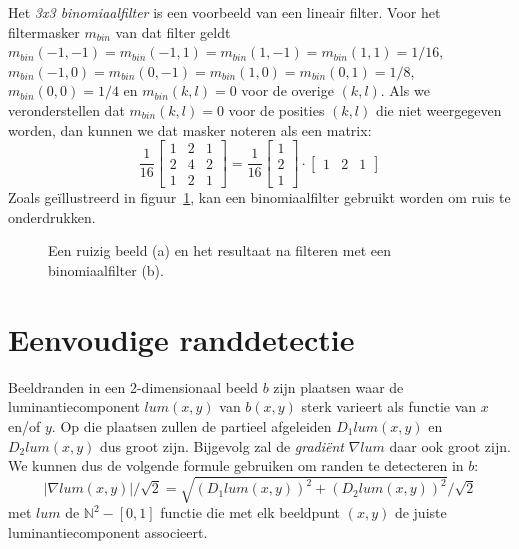 Het \emph{3x3 binomiaalfilter} is een voorbeeld van een lineair filter. Voor het filtermasker 
$m_{bin}$ van dat filter geldt $m_{bin}(-1,-1)=m_{bin}(-1,1)=m_{bin}(1,-1)=m_{bin}(1,1)=1/16$, 
$m_{bin}(-1,0)=m_{bin}(0,-1)=m_{bin}(1,0)=m_{bin}(0,1)=1/8$, $m_{bin}(0,0)=1/4$ en 
$m_{bin}(k,l)=0$ voor de overige $(k,l)$. Als we veronderstellen dat $m_{bin}(k,l)=0$ voor de 
posities $(k,l)$ die niet weergegeven worden, dan kunnen we dat masker noteren als een matrix:
\begin{displaymath}
\frac{1}{16}\left[ \begin{array}{ccc} 1 & 2 & 1\\ 2 & 4 & 2\\ 1 & 2 & 1 \end{array} \right]
= \frac{1}{16}\left[ \begin{array}{c} 1\\ 2\\ 1 \end{array} \right] \cdot 
\left[ \begin{array}{ccc} 1 & 2 & 1 \end{array} \right]
\end{displaymath}
Zoals ge\"illustreerd in figuur~\ref{fig:indische_ruizig_en_binom}, kan een binomiaalfilter gebruikt worden om ruis te onderdrukken.

\begin{figure}[bp]
\vspace{10pt}
\centering
{}
\hspace{1cm}
\caption{\label{fig:indische_ruizig_en_binom}Een ruizig beeld (a) en het resultaat na 
filteren met een binomiaalfilter (b).}
\end{figure}

\section{Eenvoudige randdetectie}
\label{sectie:randdetectie}

Beeldranden in een 2-dimensionaal beeld $b$ zijn plaatsen waar de luminantiecomponent $lum(x,y)$ van $b(x,y)$ 
sterk varieert als functie van $x$ en/of $y$. Op die plaatsen zullen de partieel afgeleiden $D_1 lum(x,y)$ en 
$D_2 lum(x,y)$ dus groot zijn. Bijgevolg zal de \emph{gradi\"ent} $\nabla lum$ daar ook groot zijn. We kunnen 
dus de volgende formule gebruiken om randen te detecteren in $b$: 
\begin{displaymath}
|\nabla lum(x,y)| / \sqrt{2} = \sqrt{(D_1 lum(x,y))^2 + (D_2 lum(x,y))^2} / \sqrt{2}
\end{displaymath}
met $lum$ de $\mathbb{N}^2 - [0,1]$ functie die met elk beeldpunt $(x,y)$ de juiste luminantiecomponent associeert.


